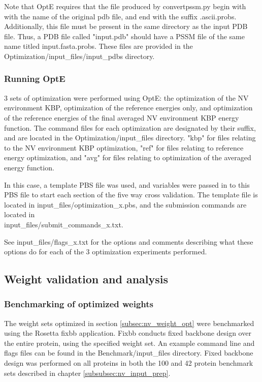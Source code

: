 Note that OptE requires that the file produced by convertpssm.py begin with with the name of the original pdb file, and end with the suffix .ascii.probs.
Additionally, this file must be present in the same directory as the input \ac{PDB} file.
Thus, a \ac{PDB} file called "input.pdb" should have a \ac{PSSM} file of the same name titled input.fasta.probs.
These files are provided in the Optimization/input\_files/input\_pdbs directory.

\subsubsection{Running OptE}
3 sets of optimization were performed using OptE: the optimization of the \ac{NV} environment \ac{KBP}, optimization of the reference energies only, and optimization of the reference energies of the final averaged \ac{NV} environment \ac{KBP} energy function.
The command files for each optimization are designated by their suffix, and are located in the Optimization/input\_files directory.
"kbp" for files relating to the \ac{NV} environment \ac{KBP} optimization, "ref" for files relating to reference energy optimization, and "avg" for files relating to optimization of the averaged energy function.  

In this case, a template \ac{PBS} file was used, and variables were passed in to this \ac{PBS} file to start each section of the five way cross validation.
The template file is located in input\_files/optimization\_x.pbs, and the submission commands are located in\\
input\_files/submit\_commands\_x.txt.

See input\_files/flags\_x.txt for the options and comments describing what these options do for each of the 3 optimization experiments performed. 

\subsection{Weight validation and analysis}

\subsubsection{Benchmarking of optimized weights}

The weight sets optimized in section \ref{subsec:nv_weight_opt} were benchmarked using the Rosetta fixbb application.
Fixbb conducts fixed backbone design over the entire protein, using the specified weight set. 
An example command line and flags files can be found in the Benchmark/input\_files directory.
Fixed backbone design was performed on all proteins in both the 100 and 42 protein benchmark sets described in chapter \ref{subsubsec:nv_input_prep}.


